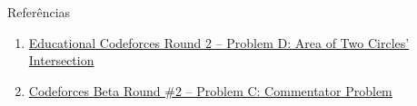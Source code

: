 \begin{frame}[fragile]{Referências}

    \begin{enumerate}
        \item \href{https://codeforces.com/problemset/problem/600/D}{Educational Codeforces Round 2 -- Problem D: Area of Two Circles' Intersection}

        \item \href{https://codeforces.com/contest/2/problem/C}{Codeforces Beta Round \#2 -- Problem C: Commentator Problem}

    \end{enumerate}

\end{frame}
